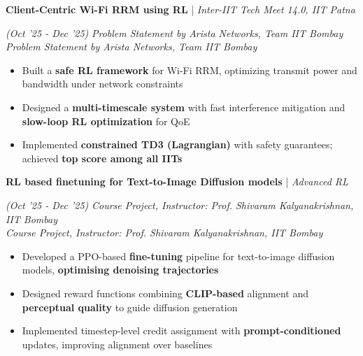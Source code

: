 \documentclass[10pt]{article}
\renewcommand{\subsection}[4]{
	\def\temp{#4}
	\vspace{2pt}
	{
		\large
		{\color{Green} \textbf{#1}} | {\sl #2} \filldate{#3}
		\ifx\temp\empty
		\else
		{
			\\[0.098em]
			\fontsize{10.5}{13.2}\selectfont
			\sl #4
		}
		\fi
	}
}
\newcommand{\filldate}[1]{\strut\hfill {\small \textit{(#1)}}}
\begin{document}
\vspace{-13px}



\newpage
{}

\subsection{Client-Centric Wi-Fi RRM using RL}{Inter-IIT Tech Meet 14.0, IIT Patna}{Oct '25 - Dec '25}{\textit{Problem Statement by Arista Networks, Team IIT Bombay}}
\begin{itemize}
\item Built a \textbf{safe RL framework} for Wi-Fi RRM, optimizing transmit power and bandwidth under network constraints
\item Designed a \textbf{multi-timescale system} with fast interference mitigation and \textbf{slow-loop RL optimization} for QoE
\item Implemented \textbf{constrained TD3 (Lagrangian)} with safety guarantees; achieved \textbf{top score among all IITs}
\end{itemize}

\subsection{RL based finetuning for Text-to-Image Diffusion models}{Advanced RL}{Oct '25 - Dec '25}{\textit{Course Project, Instructor: Prof. Shivaram Kalyanakrishnan, IIT Bombay}}
\begin{itemize}
\item Developed a PPO-based \textbf{fine-tuning} pipeline for text-to-image diffusion models, \textbf{optimising denoising trajectories}
\item Designed reward functions combining \textbf{CLIP-based} alignment and \textbf{perceptual quality} to guide diffusion generation
\item Implemented timestep-level credit assignment with \textbf{prompt-conditioned} updates, improving alignment over baselines
\end{itemize}
\end{document}
